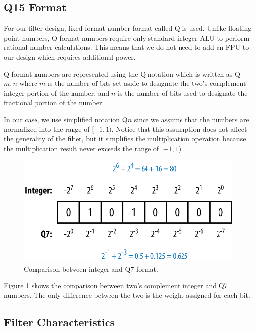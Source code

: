 \subsection{Q15 Format} \label{sec:q15}

For our filter design, fixed format number format called Q is used. Unlike floating point numbers, Q-format numbers require only standard integer ALU to perform rational number calculations. This means that we do not need to add an FPU to our design which requires additional power.

Q format numbers are represented using the Q notation which is written as Q$m,n$ where $m$ is the number of bits set aside to designate the two's complement integer portion of the number, and $n$ is the number of bits used to designate the fractional portion of the number.

In our case, we use simplified notation Q$n$ since we assume that the numbers are normalized into the range of $[-1, 1)$. Notice that this assumption does not affect the generality of the filter, but it simplifies the multiplication operation because the multiplication result never exceeds the range of $[-1, 1)$.

\begin{figure}[ht]
	\centering
	\includegraphics[scale=1.5]{images/q7}
	\caption{Comparison between integer and Q7 format.}
	\label{fig:q7}
\end{figure}

Figure \ref{fig:q7} shows the comparison between two's complement integer and Q7 numbers. The only difference between the two is the weight assigned for each bit.

\subsection{Filter Characteristics}

